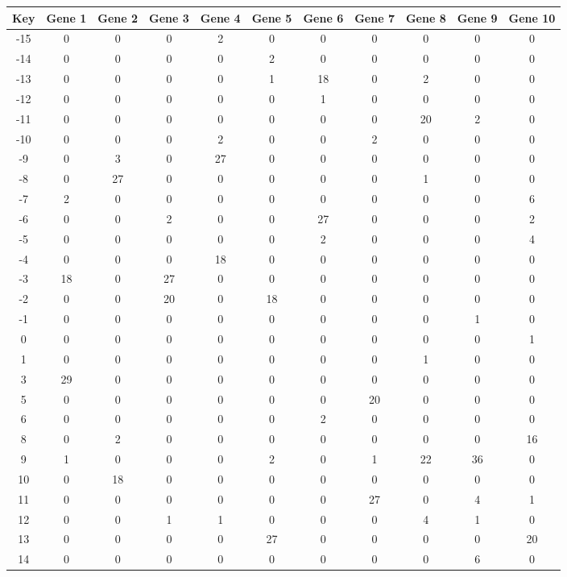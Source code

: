 \begin{tabular}{|c|c|c|c|c|c|c|c|c|c|c|}
\hline
Key & Gene 1 & Gene 2 & Gene 3 & Gene 4 & Gene 5 & Gene 6 & Gene 7 & Gene 8 & Gene 9 & Gene 10 \\
\hline
-15 & 0 & 0 & 0 & 2 & 0 & 0 & 0 & 0 & 0 & 0 \\
-14 & 0 & 0 & 0 & 0 & 2 & 0 & 0 & 0 & 0 & 0 \\
-13 & 0 & 0 & 0 & 0 & 1 & 18 & 0 & 2 & 0 & 0 \\
-12 & 0 & 0 & 0 & 0 & 0 & 1 & 0 & 0 & 0 & 0 \\
-11 & 0 & 0 & 0 & 0 & 0 & 0 & 0 & 20 & 2 & 0 \\
-10 & 0 & 0 & 0 & 2 & 0 & 0 & 2 & 0 & 0 & 0 \\
-9 & 0 & 3 & 0 & 27 & 0 & 0 & 0 & 0 & 0 & 0 \\
-8 & 0 & 27 & 0 & 0 & 0 & 0 & 0 & 1 & 0 & 0 \\
-7 & 2 & 0 & 0 & 0 & 0 & 0 & 0 & 0 & 0 & 6 \\
-6 & 0 & 0 & 2 & 0 & 0 & 27 & 0 & 0 & 0 & 2 \\
-5 & 0 & 0 & 0 & 0 & 0 & 2 & 0 & 0 & 0 & 4 \\
-4 & 0 & 0 & 0 & 18 & 0 & 0 & 0 & 0 & 0 & 0 \\
-3 & 18 & 0 & 27 & 0 & 0 & 0 & 0 & 0 & 0 & 0 \\
-2 & 0 & 0 & 20 & 0 & 18 & 0 & 0 & 0 & 0 & 0 \\
-1 & 0 & 0 & 0 & 0 & 0 & 0 & 0 & 0 & 1 & 0 \\
0 & 0 & 0 & 0 & 0 & 0 & 0 & 0 & 0 & 0 & 1 \\
1 & 0 & 0 & 0 & 0 & 0 & 0 & 0 & 1 & 0 & 0 \\
3 & 29 & 0 & 0 & 0 & 0 & 0 & 0 & 0 & 0 & 0 \\
5 & 0 & 0 & 0 & 0 & 0 & 0 & 20 & 0 & 0 & 0 \\
6 & 0 & 0 & 0 & 0 & 0 & 2 & 0 & 0 & 0 & 0 \\
8 & 0 & 2 & 0 & 0 & 0 & 0 & 0 & 0 & 0 & 16 \\
9 & 1 & 0 & 0 & 0 & 2 & 0 & 1 & 22 & 36 & 0 \\
10 & 0 & 18 & 0 & 0 & 0 & 0 & 0 & 0 & 0 & 0 \\
11 & 0 & 0 & 0 & 0 & 0 & 0 & 27 & 0 & 4 & 1 \\
12 & 0 & 0 & 1 & 1 & 0 & 0 & 0 & 4 & 1 & 0 \\
13 & 0 & 0 & 0 & 0 & 27 & 0 & 0 & 0 & 0 & 20 \\
14 & 0 & 0 & 0 & 0 & 0 & 0 & 0 & 0 & 6 & 0 \\
\hline
\end{tabular}